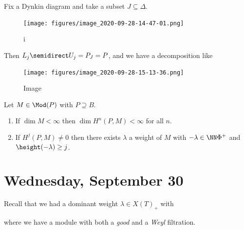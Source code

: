 \begin{example}

Fix a Dynkin diagram and take a subset \(J\subseteq \Delta\).

\begin{figure}
\centering
\texttt{[image: figures/image\_2020-09-28-14-47-01.png]}
\caption{i}
\end{figure}

Then \(L_j\semidirect U_j = P_J = P\), and we have a decomposition like

\begin{figure}
\centering
\texttt{[image: figures/image\_2020-09-28-15-13-36.png]}
\caption{Image}
\end{figure}

\end{example}

\begin{proposition}[?]

Let \(M\in \Mod(P)\) with \(P\supseteq B\).

\begin{enumerate}
\def\labelenumi{\alph{enumi}.}
\item
  If \(\dim M < \infty\) then \(\dim H^n(P, M) < \infty\) for all \(n\).
\item
  If \(H^j(P, M) \neq 0\) then there exists \(\lambda\) a weight of
  \(M\) with \(-\lambda \in \NN \Phi^+\) and
  \(\height(-\lambda) \geq j\).
\end{enumerate}

\end{proposition}

\hypertarget{wednesday-september-30}{%
\section{Wednesday, September 30}\label{wednesday-september-30}}

Recall that we had a dominant weight \(\lambda \in X(T)_+\) with

\begin{center}
\end{center}

where we have a module with both a \emph{good} and a \emph{Weyl}
filtration.

